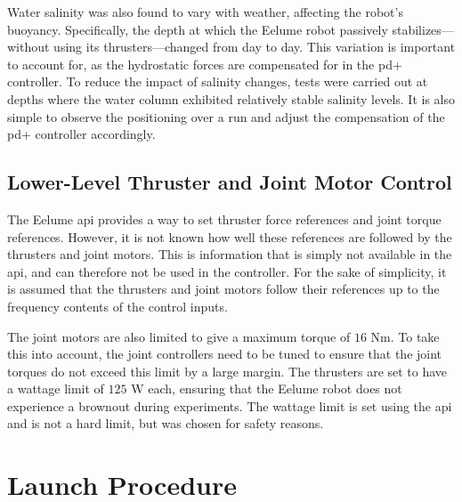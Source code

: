 Water salinity was also found to vary with weather, affecting the robot's 
buoyancy. Specifically, the depth at which the Eelume robot passively 
stabilizes—without using its thrusters—changed from day to day. This variation 
is important to account for, as the hydrostatic forces are compensated for in 
the \gls{pd+} controller. To reduce the impact of salinity changes, tests were 
carried out at depths where the water column exhibited relatively stable 
salinity levels. It is also simple to observe the positioning over a run
and adjust the compensation of the \gls{pd+} controller accordingly.

\subsection*{Lower-Level Thruster and Joint Motor Control}
The Eelume \gls{api} provides a way to set thruster force references and joint
torque references. However, it is not known how well these references are
followed by the thrusters and joint motors. This is information that is simply
not available in the \gls{api}, and can therefore not be used in the controller.
For the sake of simplicity, it is assumed that the thrusters and joint motors
follow their references up to the frequency contents of the control inputs.

The joint motors are also limited to give a maximum torque of \(16\) Nm. To take
this into account, the joint controllers need to be tuned to ensure that the
joint torques do not exceed this limit by a large margin. The thrusters are set
to have a wattage limit of \(125\) W each, ensuring that the Eelume robot does
not experience a brownout during experiments. The wattage limit is set using the
\gls{api} and is not a hard limit, but was chosen for safety reasons.


\section{Launch Procedure}


